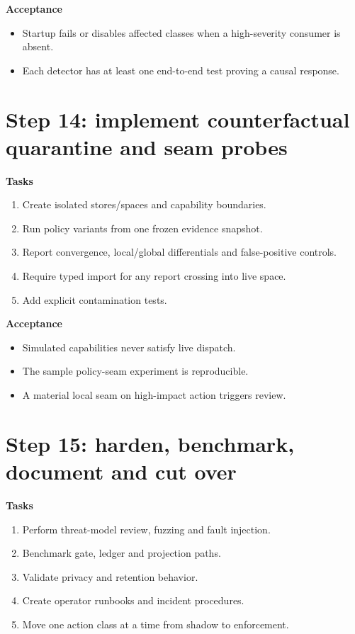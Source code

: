 \documentclass[11pt,oneside]{report}
\begin{document}
\textbf{Acceptance}
\begin{itemize}
  \item Startup fails or disables affected classes when a high-severity consumer is absent.
  \item Each detector has at least one end-to-end test proving a causal response.
\end{itemize}

\section{Step 14: implement counterfactual quarantine and seam probes}

\textbf{Tasks}
\begin{enumerate}
  \item Create isolated stores/spaces and capability boundaries.
  \item Run policy variants from one frozen evidence snapshot.
  \item Report convergence, local/global differentials and false-positive controls.
  \item Require typed import for any report crossing into live space.
  \item Add explicit contamination tests.
\end{enumerate}

\textbf{Acceptance}
\begin{itemize}
  \item Simulated capabilities never satisfy live dispatch.
  \item The sample policy-seam experiment is reproducible.
  \item A material local seam on high-impact action triggers review.
\end{itemize}

\section{Step 15: harden, benchmark, document and cut over}

\textbf{Tasks}
\begin{enumerate}
  \item Perform threat-model review, fuzzing and fault injection.
  \item Benchmark gate, ledger and projection paths.
  \item Validate privacy and retention behavior.
  \item Create operator runbooks and incident procedures.
  \item Move one action class at a time from shadow to enforcement.
\end{enumerate}
\end{document}
